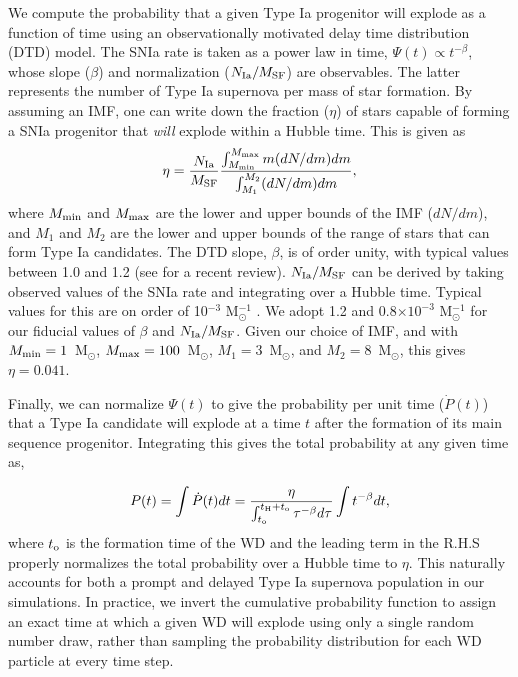 \documentclass[twocolumn]{aastex61}
\begin{document}
We compute the probability that a given Type Ia progenitor will explode as a function of time using an observationally motivated delay time distribution (DTD) model. 
The SNIa rate is taken as a power law in time, $\Psi (t) \propto t^{-\beta}$, whose slope ($\beta$) and normalization ($N_{\rm Ia}/M_{\rm SF}$) are observables. The latter represents the number of Type Ia supernova per mass of star formation. By assuming an IMF, one can write down the fraction ($\eta$) of stars capable of forming a SNIa progenitor that \textit{will} explode within a Hubble time. This is given as
\begin{equation}
\eta = \frac{N_{\rm Ia}}{M_{\rm SF}} \frac{\int_{M_{\rm min}}^{M_{\rm max}} m (dN/dm) dm }{\int_{M_{1}}^{M_{2}} (dN/dm) dm},
\end{equation}
where $M_{\rm min}$ and $M_{\rm max}$ are the lower and upper bounds of the IMF ($dN/dm$), and $M_{1}$ and $M_{2}$ are the lower and upper bounds of the range of stars that can form Type Ia candidates. The DTD slope, $\beta$, is of order unity, with typical values between 1.0 and 1.2 (see \citet{Maoz2014} for a recent review). $N_{\rm Ia}/M_{\rm SF}$ can be derived by taking observed values of the SNIa rate and integrating over a Hubble time. Typical values for this are on order of 10$^{-3}$ M$_{\odot}^{-1}$ \citep{Maoz2014}. We adopt 1.2 \citep{Maoz2010} and 0.8$\times 10^{-3}$ M$_{\odot}^{-1}$ \citep{GraurMaoz2013} for our fiducial values of $\beta$ and $N_{\rm Ia}/M_{\rm SF}$. Given our choice of IMF, and with $M_{\rm min} = 1$~M$_{\odot}$, $M_{\rm max}=100$~M$_{\odot}$, $M_{1}=3$~M$_{\odot}$, and $M_{2}=8$~M$_{\odot}$, this gives $\eta = 0.041$.

Finally, we can normalize $\Psi(t)$ to give the probability per unit time ($\dot{P}(t)$) that a Type Ia candidate will explode at a time $t$ after the formation of its main sequence progenitor. Integrating this gives the total probability at any given time as,

\begin{equation}
P(t) = \int \dot{P}(t)dt = \frac{\eta}{{ \int_{t_{\rm o}}^{t_{\rm H} + t_{\rm o}} \tau^{-\beta} d\tau}} \int t^{-\beta} dt,
\end{equation}
where $t_{\rm o}$ is the formation time of the WD and the leading term in the R.H.S properly normalizes the total probability over a Hubble time to $\eta$. This naturally accounts for both a prompt and delayed Type Ia supernova population in our simulations.
In practice, we invert the cumulative probability function to assign an exact time at which a given WD will explode using only a single random number draw, rather than sampling the probability distribution for each WD particle at every time step.
\end{document}
